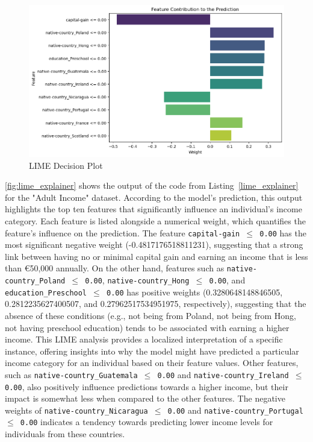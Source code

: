 \documentclass[10pt,journal,compsoc]{IEEEtran}
\begin{document}
\begin{figure}[H]
    \centering
    \includegraphics[width=1\linewidth]{images/lime_summary_plot.png}
    \caption{LIME Decision Plot}
    \label{fig:lime_explainer}
\end{figure}

\autoref{fig:lime_explainer} shows the output of the code from Listing~\ref{lime_explainer} for the "Adult Income" dataset. According to the model's prediction, this output highlights the top ten features that significantly influence an individual's income category.
Each feature is listed alongside a numerical weight, which quantifies the feature's influence on the prediction. 
The feature \texttt{capital-gain $\leq$ 0.00} has the most significant negative weight (-0.4817176518811231), suggesting that a strong link between having no or minimal capital gain and earning an income that is less than €50,000 annually. On the other hand, features such as \texttt{native-country\_Poland $\leq$ 0.00}, \texttt{native-country\_Hong $\leq$ 0.00}, and \texttt{education\_Preschool $\leq$ 0.00} has positive weights 
(0.3280648148846505, 0.2812235627400507, and 0.27962517534951975, respectively), suggesting that the absence of these conditions (e.g., not being from Poland, not being from Hong, not having preschool education) tends to be associated with earning a higher income. This LIME analysis provides a localized interpretation of a specific instance, offering insights into why the model might have predicted a particular income category for an individual based on their feature values. 
Other features, such as \texttt{native-country\_Guatemala $\leq$ 0.00} and \texttt{native-country\_Ireland $\leq$ 0.00}, also positively influence predictions towards a higher income, but their impact is somewhat less when compared to the other features. The negative weights of \texttt{native-country\_Nicaragua $\leq$ 0.00} 
and \texttt{native-country\_Portugal $\leq$ 0.00} indicates a tendency towards predicting lower income levels for individuals from these countries.
\end{document}
